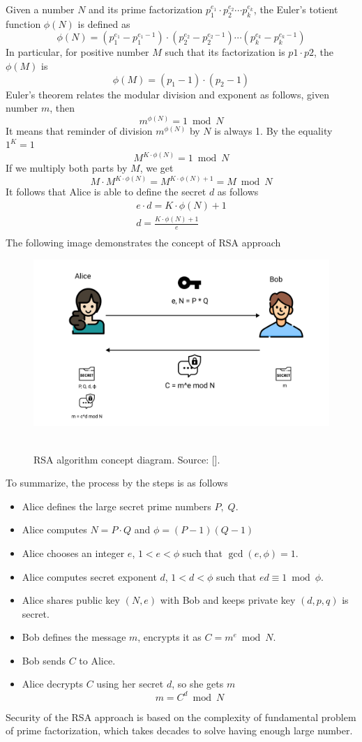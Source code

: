 Given a number $N$ and its prime factorization $p_1^{e_1}\cdot p_2^{e_2} \cdots p_k^{e_k}$, the Euler's totient function
$\phi(N)$ is defined as
\[
    \phi(N) = (p_1^{e_1} - p_1^{e_1 - 1}) \cdot (p_2^{e_2} - p_2^{e_2 - 1}) \cdots (p_k^{e_k} - p_k^{e_k - 1})
\]
In particular, for positive number $M$ such that its factorization is $p1 \cdot p2$, the $\phi(M)$ is
\[
    \phi(M) = (p_1 -1) \cdot (p_2 - 1)
\]
Euler's theorem relates the modular division and exponent as follows, given number $m$, then
\[
    m^{\phi(N)} = 1 \bmod N
\]
It means that reminder of division $m^{\phi(N)}$ by $N$ is always 1.
By the equality $1^K = 1$
\[
    M^{K \cdot \phi(N)} = 1 \bmod N
\]
If we multiply both parts by $M$, we get
\[
    M \cdot M^{K \cdot \phi(N)} = M^{K \cdot \phi(N) + 1} = M \bmod N
\]
It follows that Alice is able to define the secret $d$ as follows
\begin{gather*}
    e \cdot d = K \cdot \phi(N) + 1\\
    d = \frac{K \cdot \phi(N) + 1}{e}\\
\end{gather*}
The following image demonstrates the concept of RSA approach
\begin{figure}[H]
    \centering
    \includegraphics[width=1\textwidth]{Pictures/12_RSA_encryption_concept_diagram}
    ~\caption{RSA algorithm concept diagram. Source: [\cite{mango2021figma}].}\label{fig:figure8}
\end{figure}
To summarize, the process by the steps is as follows
\begin{itemize}
    \item Alice defines the large secret prime numbers $P, \; Q$.
    \item Alice computes $N = P \cdot Q$ and $\phi = (P-1)(Q-1)$
    \item Alice chooses an integer $e$, $1<e< \phi$ such that $\gcd(e, \phi) = 1$.
    \item Alice computes secret exponent $d$, $1<d< \phi$ such that $ed \equiv 1 \bmod \phi$.
    \item Alice shares public key $(N,e)$ with Bob and keeps private key $(d, p, q)$ is secret.
    \item Bob defines the message $m$, encrypts it as $C = m^{e} \bmod N$.
    \item Bob sends $C$ to Alice.
    \item Alice decrypts $C$ using her secret $d$, so she gets $m$
    \[
        m = C^d \bmod N
    \]
\end{itemize}
Security of the RSA approach is based on the complexity of fundamental problem of prime factorization,
which takes decades to solve having enough large number.